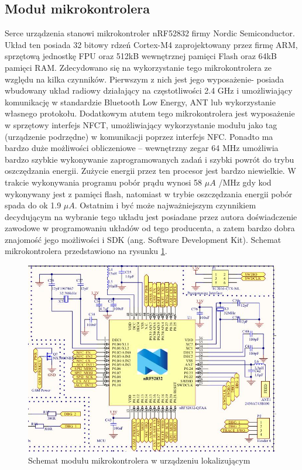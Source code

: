 \subsection{Moduł mikrokontrolera}

Serce urządzenia stanowi mikrokontroler nRF52832 firmy Nordic Semiconductor. Układ ten posiada 32 bitowy rdzeń Cortex-M4 zaprojektowany przez firmę ARM, sprzętową jednostkę FPU oraz 512kB wewnętrznej pamięci Flash oraz 64kB pamięci RAM. Zdecydowano się na wykorzystanie tego mikrokontrolera ze względu na kilka czynników. Pierwszym z nich jest jego wyposażenie- posiada wbudowany układ radiowy działający na częstotliwości 2.4 GHz i umożliwiający komunikację w standardzie Bluetooth Low Energy, ANT lub wykorzystanie własnego protokołu. Dodatkowym atutem tego mikrokontrolera jest wyposażenie w sprzętowy interfejs NFCT, umożliwiający wykorzystanie modułu jako tag (urządzenie podrzędne) w komunikacji poprzez interfejs NFC. Ponadto ma bardzo duże możliwości obliczeniowe – wewnętrzny zegar 64 MHz umożliwia bardzo szybkie wykonywanie zaprogramowanych zadań i szybki powrót do trybu oszczędzania energii. Zużycie energii przez ten procesor jest bardzo niewielkie. W trakcie wykonywania programu pobór prądu wynosi 58 $\mu A$ /MHz gdy kod wykonywany jest z pamięci flash, natomiast w trybie oszczędzania energii pobór spada do ok 1.9 $\mu A$. Ostatnim i być może najważniejszym czynnikiem decydującym na wybranie tego układu jest posiadane przez autora doświadczenie zawodowe w programowaniu układów od tego producenta, a zatem bardzo dobra znajomość jego możliwości i SDK (ang. Software Development Kit). Schemat mikrokontrolera przedstawiono na rysunku \ref{fig:image_mainboard_functional_mcu}.

\begin{figure}[H]
	\centering
	\includegraphics[width=15cm]{img/schematics/mainboard_functional_mcu.jpg}
	\caption{Schemat modułu mikrokontrolera w urządzeniu lokalizującym}
	\label{fig:image_mainboard_functional_mcu}
\end{figure}

